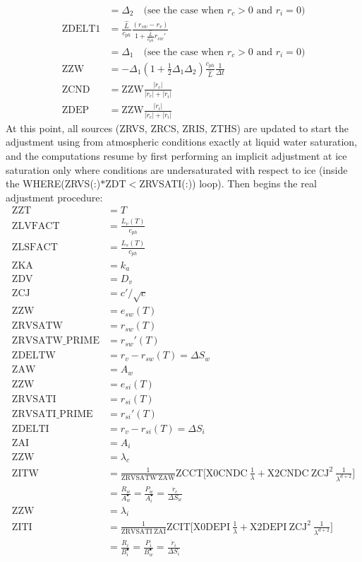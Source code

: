 \begin{align}
 &= \Delta_2 \quad \text{(see the case when $r_c>0$ and $r_i=0$)}\\
 \mathrm{ZDELT1} &= \frac{\hat{L}}{c_{ph}} \frac{(r_{sw}-r_v)}{1 + \frac{\hat{L}}{c_{ph}} r_{sw}'} \\
 &= \Delta_1 \quad \text{(see the case when $r_c>0$ and $r_i=0$)}\\
 \mathrm{ZZW} &= - \Delta_1 \left( 1 + \frac{1}{2} \Delta_1 \Delta_2 \right) \frac{c_{ph}}{\hat{L}} \frac{1}{\Delta t} \\
 \mathrm{ZCND} &= \mathrm{ZZW} \frac{|\dot{r}_c|}{|\dot{r}_c| + |\dot{r}_i|} \\
 \mathrm{ZDEP} &= \mathrm{ZZW} \frac{|\dot{r}_i|}{|\dot{r}_c| + |\dot{r}_i|}
 \end{align}
 At this point, all sources (ZRVS, ZRCS, ZRIS, ZTHS) are updated to start the adjustment using \citet{Reisin1996} from atmospheric conditions exactly at liquid water saturation, and the computations resume by first performing an implicit adjustment at ice saturation only where conditions are undersaturated with respect to ice (inside the WHERE(ZRVS(:)$*$ZDT$<$ZRVSATI(:)) loop). Then begins the real adjustment procedure:
 \begin{align}
 \mathrm{ZZT} &= T \\
 \mathrm{ZLVFACT} &= \frac{L_v(T)}{c_{ph}} \\
 \mathrm{ZLSFACT} &= \frac{L_s(T)}{c_{ph}} \\
 \mathrm{ZKA} &= k_a \\
 \mathrm{ZDV} &= D_v \\
 \mathrm{ZCJ} &= c'/\sqrt c \\
 \mathrm{ZZW} &= e_{sw}(T) \\
 \mathrm{ZRVSATW} &= r_{sw}(T) \\
 \mathrm{ZRVSATW\_PRIME} &= r_{sw}'(T) \\
 \mathrm{ZDELTW} &= r_v - r_{sw}(T) = \Delta S_w \\
 \mathrm{ZAW} &= A_w \\
 \mathrm{ZZW} &= e_{si}(T) \\
 \mathrm{ZRVSATI} &= r_{si}(T) \\
 \mathrm{ZRVSATI\_PRIME} &= r_{si}'(T) \\
 \mathrm{ZDELTI} &= r_v - r_{si}(T) = \Delta S_i \\
 \mathrm{ZAI} &= A_i \\
 \mathrm{ZZW} &= \lambda_c \\
 \mathrm{ZITW} &= \frac{1}{\mathrm{ZRVSATW} ~ \mathrm{ZAW}} \mathrm{ZCCT} \bigg[\mathrm{X0CNDC} ~ \frac{1}{\lambda} + \mathrm{X2CNDC} ~ \mathrm{ZCJ}^2 ~ \frac{1}{\lambda^{d+2}}\bigg]  \\ 
 &= \frac{R_w}{A_w^\bullet} = \frac{P_w}{A_i^\bullet} = \frac{\dot{r}_c}{\Delta S_w} \\
 \mathrm{ZZW} &= \lambda_i \\
 \mathrm{ZITI} &= \frac{1}{\mathrm{ZRVSATI} ~ \mathrm{ZAI}} \mathrm{ZCIT} \bigg[\mathrm{X0DEPI} ~ \frac{1}{\lambda} + \mathrm{X2DEPI} ~ \mathrm{ZCJ}^2 ~ \frac{1}{\lambda^{d+2}}\bigg]  \\ 
 &= \frac{R_i}{B_i^\bullet} = \frac{P_i}{B_w^\bullet} = \frac{\dot{r}_i}{\Delta S_i}
 \end{align}
 
